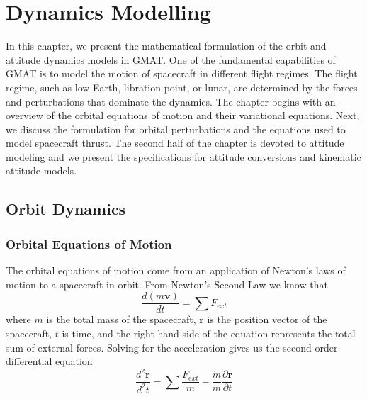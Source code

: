 \chapter{Dynamics Modelling}

In this chapter, we
present the mathematical formulation of the orbit and attitude dynamics models in GMAT.
One of the fundamental capabilities of GMAT is to model the motion
of spacecraft in different flight regimes.  The flight regime,
such as low Earth, libration point, or lunar, are determined by the
forces and perturbations that dominate the dynamics.
The chapter begins with an overview of
the orbital equations of motion and their variational equations.  Next, we
discuss the formulation for orbital perturbations and the equations used to model
spacecraft thrust.  The second half of the chapter is devoted to attitude modeling and
we present the specifications for  attitude conversions and kinematic attitude models.


\section{Orbit Dynamics}

\subsection{Orbital Equations of Motion}

The orbital equations of motion come from an application of Newton's laws of motion to a spacecraft in orbit.  From Newton's Second Law we know that
%
\begin{equation}
     \frac{d (m\mathbf{v})}{d t} = \sum F_{ext}
\end{equation}
%
where $m$ is the total mass of the spacecraft, $\mathbf{r}$ is the position vector of the spacecraft, $t$ is time, and the right hand side of the equation represents the total sum of external forces.  Solving for the acceleration gives us the
second order differential equation
%
\begin{equation}
   \frac{d^2 \mathbf{r}}{d^2 t} = \sum \frac{F_{ext}}{m} - \frac{\dot{m}}{m}\frac{\partial \mathbf{r}}{\partial t}
   \label{Eq:SCAcc}
\end{equation}
%

